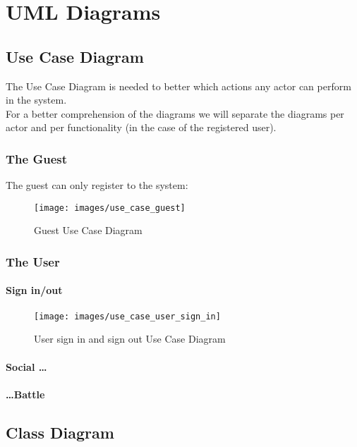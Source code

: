 \chapter{UML Diagrams}
	\section{Use Case Diagram}
	The Use Case Diagram is needed to better which actions any actor can perform in the  system.\\
	For a better comprehension of the diagrams we will separate the diagrams per actor and per functionality (in the case of the registered user).

	\subsection{The Guest}
		The guest can only register to the system:
		\begin{figure}[ht!]
			\centering
			\texttt{[image: images/use\_case\_guest]}
			\caption{Guest Use Case Diagram}
			\label{fig:use_case_guest}
		\end{figure}

	\subsection{The User}
		\subsubsection{Sign in/out}
		\begin{figure}[ht!]
			\centering
			\texttt{[image: images/use\_case\_user\_sign\_in]}
			\caption{User sign in and sign out Use Case Diagram}
			\label{fig:use_case_user_sign_in}
		\end{figure}
		\subsubsection{Social \ldots}

		\subsubsection{\ldots Battle}

	\section{Class Diagram}